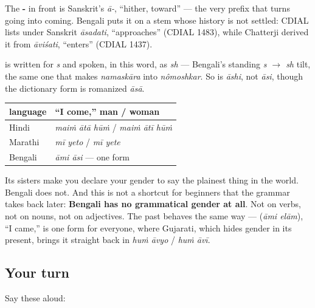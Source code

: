 \begin{cousinweb}
The \textbf{-} in front is Sanskrit's \emph{ā-}, \textquotedblleft{}hither, toward\textquotedblright{} — the very prefix that turns going into coming. Bengali puts it on a stem whose history is not settled: CDIAL lists \textbf{} under Sanskrit \emph{āsadati}, \textquotedblleft{}approaches\textquotedblright{} (CDIAL 1483), while Chatterji derived it from \emph{āviśati}, \textquotedblleft{}enters\textquotedblright{} (CDIAL 1437).
\end{cousinweb}

\begin{sounds}
\textbf{} is written for \emph{s} and spoken, in this word, as \emph{sh} — Bengali's standing \emph{s $\to$ sh} tilt, the same one that makes \emph{namaskāra} into \emph{nômoshkar}. So  is \emph{āshi}, not \emph{āsi}, though the dictionary form is romanized \emph{āsā}.
\end{sounds}

\begin{grammarlens}[title={Grammar Lens: no gender, not here, not anywhere}]
\noindent
\begin{tabularx}{\linewidth}{@{}>{\raggedright\arraybackslash}X>{\raggedright\arraybackslash}X@{}}
\toprule
\textbf{language} & \textbf{\textquotedblleft{}I come,\textquotedblright{} man / woman} \\
\midrule
Hindi & \emph{maiṁ ātā hūṁ} / \emph{maiṁ ātī hūṁ} \\
Marathi & \emph{mī yeto} / \emph{mī yete} \\
Bengali & \emph{āmi āsi} — one form \\
\bottomrule
\end{tabularx}

Its sisters make you declare your gender to say the plainest thing in the world. Bengali does not. And this is not a shortcut for beginners that the grammar takes back later: \textbf{Bengali has no grammatical gender at all}. Not on verbs, not on nouns, not on adjectives. The past behaves the same way —   (\emph{āmi elām}), \textquotedblleft{}I came,\textquotedblright{} is one form for everyone, where Gujarati, which hides gender in its present, brings it straight back in \emph{huṁ āvyo} / \emph{huṁ āvī}.
\end{grammarlens}

\subsection*{Your turn}
Say these aloud:

